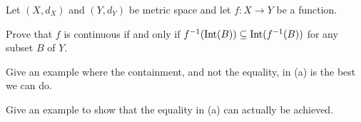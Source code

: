\item Let $(X,d_X)$ and $(Y,d_Y)$ be metric space and let $f: X \to Y$ be a function. 
\ba
\item Prove that $f$ is continuous if and only if $ f^{-1}(\text{Int}(B)) \subseteq \text{Int}(f^{-1}(B))$ for any subset $B$ of $Y$. 

\item Give an example where the containment, and not the equality, in (a) is the best we can do.  

\item Give an example to show that the equality in (a) can actually be achieved. 

\ea

\begin{comment}

\ExerciseSolution

\ba
\item  First assume that $f$ is a continuous function. Let $B$ be a subset of $Y$. Now $\Int(B)$ is an open set, so $f^{-1}(\Int(B))$ is an open set in $X$. Now we demonstrate that $f^{-1}(\Int(B)) \subseteq f^{-1}(B)$. Let $x \in f^{-1}(\Int(B))$. Since $f(x) \in \Int(B) \subseteq B$ it follows that $x \in f^{-1}(B)$. Thus, $f^{-1}(\Int(B)) \subseteq f^{-1}(B)$. The fact that $\Int(f^{-1}(B))$ is the largest open subset of $f^{-1}(B)$ means that $f^{-1}(\Int(B)) \subseteq \Int(f^{-1}(B))$. 

Now we assume that $f^{-1}(\Int(B)) \subseteq \Int(f^{-1}(B))$ for any subset $B$ of $Y$ and prove that $f$ is a continuous function. Let $O$ be an open set in $Y$. Then $O = \Int(O)$. It follows that 
\[f^{-1}(O) = f^{-1}(\Int(O)) \subseteq  \Int(f^{-1}(O)).\]
Since the interior of any set $A$ is a subset of $A$, we also have $\Int(f^{-1}(O)) \subseteq f^{-1}(O)$. Therefore, $f^{-1}(O) = \Int(f^{-1}(O))$ and $f^{-1}(O)$ is an open set. We conclude that $f$ is a continuous function.

\item  Let $(X,d_X) = (\R, d)$ with the discrete metric and $(Y, d_Y) = (\R, d_E)$. The every function from $X$ to $Y$ is continuous. Let $f: X \to Y$ be defined by $f(x) = x$. Let $B = \{0,1\}$ in $Y$. Then $f^{-1}(B) = \{0,1\}$ is an open set in $X$ and so $\Int(f^{-1}(B)) = \{0,1\}$. However, $\Int(B) = \emptyset$, so $f^{-1}(\Int(B)) = \emptyset$ as well. So in this case $f^{-1}(\Int(B))$ is not equal to $\Int(f^{-1}(B))$ even though $f$ is a continuous function.   

\item Let $X = Y = \R$, both with the Euclidean metric, and let $F$ be the identity mapping. Let $B$ be the open interval $(0,1)$. Then $\Int(B) = B$ and $f^{-1}(\Int(B)) = \Int(B) = B = f^{-1}(B) = f^{-1}(\Int(B))$. 

\ea


\end{comment}

